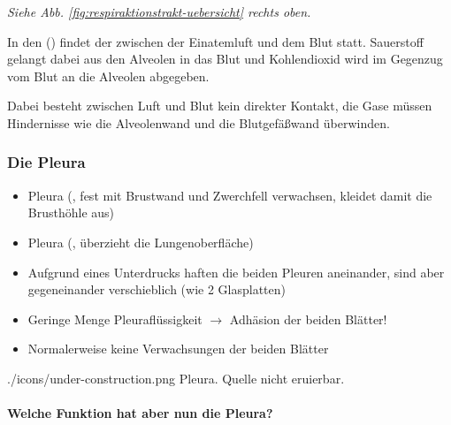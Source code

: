 \emph{Siehe Abb. \ref{fig:respiraktionstrakt-uebersicht}
rechts oben.}

In den  () findet der
 zwischen der
Einatemluft und dem Blut statt. Sauerstoff gelangt dabei aus den Alveolen in das Blut und
Kohlendioxid wird im Gegenzug vom Blut an die Alveolen
abgegeben.

Dabei besteht zwischen Luft und Blut kein direkter Kontakt, die Gase
müssen Hindernisse wie die Alveolenwand und die Blutgefäßwand
überwinden.  



\subsubsection{Die Pleura}\label{topic:pleura}

{
\begin{itemize}
    \item {} Pleura (, fest mit
    Brustwand und Zwerchfell verwachsen, kleidet damit die
    Brusthöhle aus)  
    \item {} Pleura (,
    überzieht die Lungenoberfläche)  
    \item Aufgrund eines Unterdrucks haften die beiden Pleuren aneinander,
    sind aber gegeneinander verschieblich (wie 2 Glasplatten)
    \item Geringe Menge Pleuraflüssigkeit ${\rightarrow}$ Adhäsion der
    beiden Blätter!
    \item Normalerweise keine Verwachsungen der beiden Blätter
\end{itemize}


}{}
{./icons/under-construction.png}
{Pleura.}
{Quelle nicht eruierbar.}




\paragraph{Welche Funktion hat aber nun die Pleura?}

